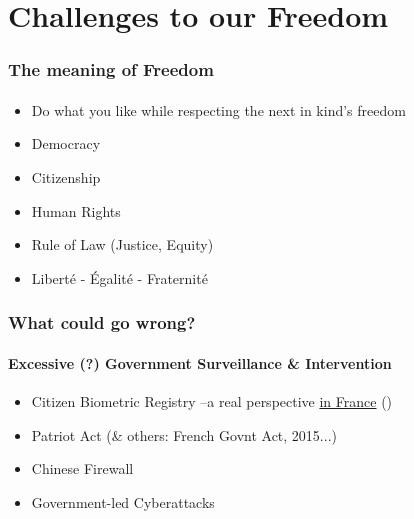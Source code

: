 
\section[Section]{Challenges to our Freedom}
	\begin{frame}
	\frametitle{The meaning of Freedom}
	\framesubtitle{}
		\begin{itemize}[<+->]
			\item Do what you like while respecting the next in kind's freedom
			\item Democracy
			\item Citizenship
			\item Human Rights
			\item Rule of Law (Justice, Equity)
			\item Liberté - Égalité - Fraternité
		\end{itemize}
	\end{frame}

	\begin{frame}
	\frametitle{What could go wrong?}
	\framesubtitle{Excessive (?) Government Surveillance \& Intervention}
		\begin{itemize}[<+->]
			\item Citizen Biometric Registry --a real perspective \href{http://www.pcworld.com/article/3139461/security/french-plan-for-biometric-database-of-60-million-people-sparks-outcry.html}{in France} (\cite{frbiometric})
			\item Patriot Act (\& others: French Govnt Act, 2015...)
			\item Chinese Firewall
			\item Government-led Cyberattacks
		\end{itemize}
	\end{frame}

